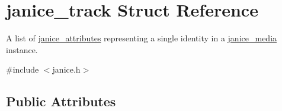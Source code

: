 \hypertarget{structjanice__track}{}\section{janice\+\_\+track Struct Reference}
\label{structjanice__track}


A list of \hyperlink{structjanice__attributes}{janice\+\_\+attributes} representing a single identity in a \hyperlink{structjanice__media}{janice\+\_\+media} instance.  




{\ttfamily \#include $<$janice.\+h$>$}

\subsection*{Public Attributes}
